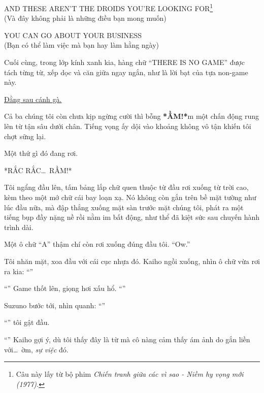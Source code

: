 \documentclass[../main.tex]{subfiles}
\begin{document}
\begin{center}
  AND THESE AREN'T THE DROIDS YOU'RE LOOKING FOR\footnote{Câu này lấy từ bộ phim \textit{Chiến tranh giữa các vì sao - Niềm hy vọng mới (1977).}}\\(Và đây không phải là những điều bạn mong muốn)
\end{center}

\begin{center}
  YOU CAN GO ABOUT YOUR BUSINESS\\(Bạn có thể làm việc mà bạn hay làm hằng ngày)
\end{center}

Cuối cùng, trong lớp kính xanh kia, hàng chữ ``THERE IS NO GAME'' được tách từng từ, xếp dọc và căn giữa ngay ngắn, như là lời bạt của tựa non-game này.


\begin{center}
  \uline{Đằng sau cánh gà.}
\end{center}


Cả ba chúng tôi còn chưa kịp ngừng cười thì bỗng \textbf{*ẦM!*}m một chấn động rung lên từ tận sâu dưới chân. Tiếng vọng ấy dội vào khoảng không vô tận khiến tôi chợt sững lại.

Một thứ gì đó đang rơi.

*RẮC RẮC\dots\ RẦM!*

Tôi ngẩng đầu lên, tấm bảng lắp chữ quen thuộc từ đầu rơi xuống từ trời cao, kèm theo một mớ chữ cái bay loạn xạ. Nó không còn gắn trên bề mặt tường như lúc đầu nữa, mà đập thẳng xuống mặt sàn trước mặt chúng tôi, phát ra một tiếng bụp đầy nặng nề rồi nằm im bất động, như thể đã kiệt sức sau chuyến hành trình dài.

Một ô chữ ``A'' thậm chí còn rơi xuống đúng đầu tôi. ``Ow.''

Tôi nhăn mặt, xoa đầu với cái cục nhựa đó. Kaiho ngồi xuống, nhìn ô chữ vừa rơi ra kia: ``''

``'' Game thốt lên, giọng hơi xấu hổ. ``''

Suzuno bước tới, nhìn quanh: ``''

``'' tôi gật đầu.

``'' Kaiho gợi ý, dù tôi thấy đây là từ mà cô nàng cảm thấy ám ảnh do gắn liền với\dots\ ờm, \emph{sự việc} đó.
\end{document}
